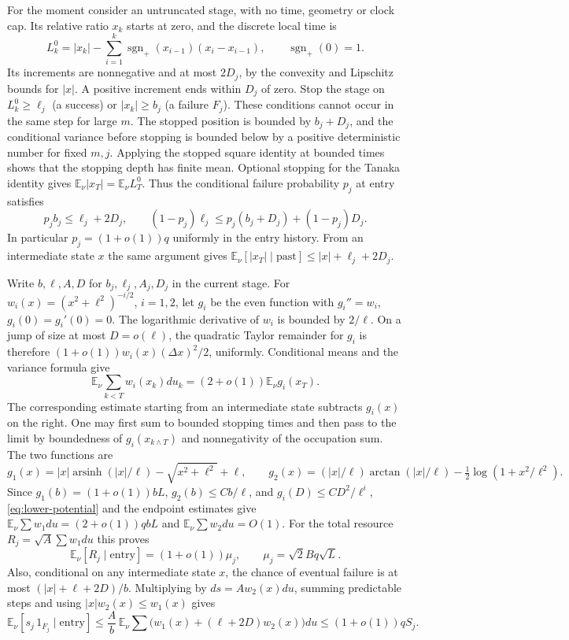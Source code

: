 \documentclass[11pt]{article}
\newcommand{\1}{\mathbf{1}}
\numberwithin{equation}{section}
\newcommand{\E}{\mathbb E}
\newcommand{\sgn}{\operatorname{sgn}}
\begin{document}
For the moment consider an untruncated stage, with no time,
geometry or clock cap. Its relative ratio \(x_k\) starts at
zero, and the discrete local time is
\[
 L_k^0=|x_k|-\sum_{i=1}^k
         \sgn_+(x_{i-1})(x_i-x_{i-1}),\qquad \sgn_+(0)=1 .
\]
Its increments are nonnegative and at most \(2D_j\), by the
convexity and Lipschitz bounds for \(|x|\). A positive increment
ends within \(D_j\) of zero. Stop the stage on \(L_k^0\ge\ell_j\)
(a success) or \(|x_k|\ge b_j\) (a failure \(F_j\)). These
conditions cannot occur in the same step for large \(m\).
The stopped position is bounded by \(b_j+D_j\), and the
conditional variance before stopping is bounded below by a
positive deterministic number for fixed \(m,j\). Applying the
stopped square identity at bounded times shows that the stopping
depth has finite mean. Optional stopping for the Tanaka identity
gives \(\E_\nu|x_T|=\E_\nu L_T^0\). Thus the conditional failure
probability \(p_j\) at entry satisfies
\[
 p_j b_j\le\ell_j+2D_j,\qquad
 (1-p_j)\ell_j\le p_j(b_j+D_j)+(1-p_j)D_j .
\]
In particular \(p_j=(1+o(1))q\) uniformly in the entry history.
From an intermediate state \(x\) the same argument gives
\(\E_\nu[|x_T|\mid\mathrm{past}]\le |x|+\ell_j+2D_j\).

Write \(b,\ell,A,D\) for \(b_j,\ell_j,A_j,D_j\) in the current
stage. For \(w_i(x)=(x^2+\ell^2)^{-i/2}\), \(i=1,2\), let \(g_i\)
be the even function with \(g_i''=w_i\), \(g_i(0)=g_i'(0)=0\).
The logarithmic derivative of \(w_i\) is bounded by \(2/\ell\).
On a jump of size at most \(D=o(\ell)\), the quadratic Taylor
remainder for \(g_i\) is therefore
\((1+o(1))w_i(x)(\Delta x)^2/2\), uniformly.
Conditional means and the variance formula give
\begin{equation}\label{eq:lower-potential}
 \E_\nu\sum_{k<T} w_i(x_k)du_k
  =(2+o(1))\E_\nu g_i(x_T).
\end{equation}
The corresponding estimate starting from an intermediate
state subtracts \(g_i(x)\) on the right. One may first
sum to bounded stopping times and then pass to the limit
by boundedness of \(g_i(x_{k\wedge T})\) and nonnegativity of
the occupation sum. The two functions are
\[
 g_1(x)=|x|\operatorname{arsinh}(|x|/\ell)
                -\sqrt{x^2+\ell^2}+\ell,\qquad
 g_2(x)=(|x|/\ell)\arctan(|x|/\ell)
                -\tfrac12\log(1+x^2/\ell^2).
\]
Since \(g_1(b)=(1+o(1))bL\), \(g_2(b)\le Cb/\ell\), and
\(g_i(D)\le CD^2/\ell^i\), \eqref{eq:lower-potential} and the endpoint estimates
give \(\E_\nu\sum w_1du=(2+o(1))qbL\) and
\(\E_\nu\sum w_2du=O(1)\).
For the total resource \(R_j=\sqrt A\sum w_1du\) this proves
\begin{equation}\label{eq:lower-resource}
 \E_\nu[R_j\mid\mathrm{entry}]=(1+o(1))\mu_j,\qquad
 \mu_j=\sqrt2 B q\sqrt L.
\end{equation}
Also, conditional on any intermediate state \(x\), the
chance of eventual failure is at most \((|x|+\ell+2D)/b\).
Multiplying by \(ds=Aw_2(x)du\), summing predictable steps and
using \(|x|w_2(x)\le w_1(x)\) gives
\begin{equation}\label{eq:lower-failure-clock}
 \E_\nu[s_j\,1_{F_j}\mid\mathrm{entry}]
  \le \frac A b\,\E_\nu\sum\bigl(w_1(x)+(\ell+2D)w_2(x)\bigr)du
  \le (1+o(1))qS_j .
\end{equation}
\end{document}
